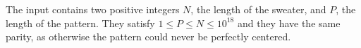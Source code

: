 

The input contains two positive integers $N$, the length of the sweater,
and $P$, the length of the pattern. They satisfy $1 \leq P \leq N \leq
10^{18}$ and they have the same parity, as otherwise the pattern could
never be perfectly centered.


